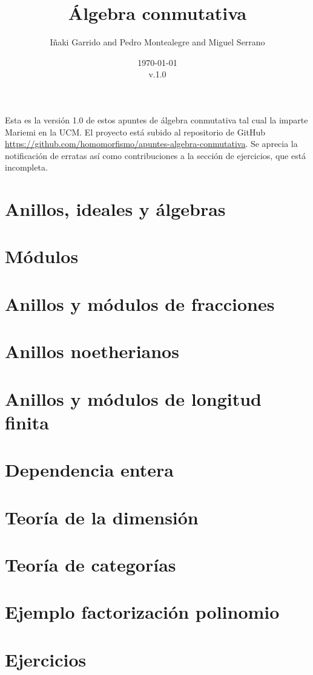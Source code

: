 \documentclass[a4paper,12pt]{book}
\title{Álgebra conmutativa}
\author{Iñaki Garrido and Pedro Montealegre and Miguel Serrano}
\date{\today \\ v.1.0}
\theoremstyle{definition}
\begin{document}
\maketitle
\frontmatter
Esta es la versión 1.0 de estos apuntes de álgebra conmutativa tal cual la imparte Mariemi en la UCM. El proyecto está subido al repositorio de GitHub \url{https://github.com/homomorfismo/apuntes-algebra-conmutativa}. Se aprecia la notificación de erratas así como contribuciones a la sección de ejercicios, que está incompleta.
\tableofcontents
\mainmatter
\chapter{Anillos, ideales y álgebras}

\chapter{Módulos}

\chapter{Anillos y módulos de fracciones}

\chapter{Anillos noetherianos}

\chapter{Anillos y módulos de longitud finita}

\chapter{Dependencia entera}

\chapter{Teoría de la dimensión}



\appendix
\chapter{Teoría de categorías}

\chapter{Ejemplo factorización polinomio}

\chapter{Ejercicios}

\end{document}
